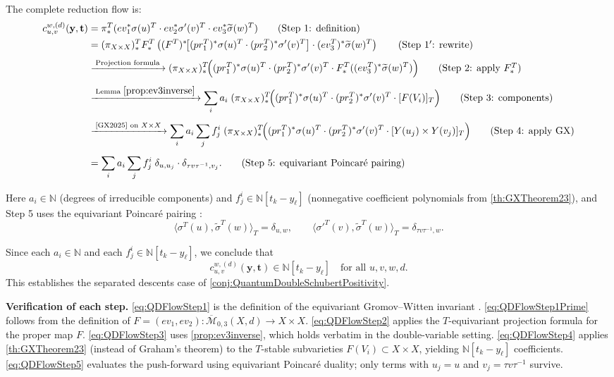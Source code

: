 The complete reduction flow is:
{\allowdisplaybreaks
\begin{align}
c_{u,v}^{w,(d)}(\mathbf{y},\mathbf{t})
&= \pi_*^T(ev_1^*\sigma(u)^T \cdot ev_2^*\sigma'(v)^T \cdot ev_3^*\widetilde{\sigma}(w)^T) \tag{Step 1: definition} \label{eq:QDFlowStep1}\\
&= (\pi_{X \times X})_*^T F_*^T\left((F^T)^*\!\big[(pr_1^T)^*\sigma(u)^T \cdot (pr_2^T)^*\sigma'(v)^T\big] \cdot (ev_3^T)^*\widetilde{\sigma}(w)^T\right) \tag{Step $1'$: rewrite} \label{eq:QDFlowStep1Prime}\\[4pt]
&\xrightarrow{\;\text{Projection formula}\;} (\pi_{X \times X})_*^T\!\Big((pr_1^T)^*\sigma(u)^T \cdot (pr_2^T)^*\sigma'(v)^T \cdot F_*^T((ev_3^T)^*\widetilde{\sigma}(w)^T)\Big) \tag{Step 2: apply $F_*^T$} \label{eq:QDFlowStep2}\\[4pt]
&\xrightarrow{\;\text{Lemma }\cref{prop:ev3inverse}\;} \sum_i a_i \; (\pi_{X \times X})_*^T\!\Big((pr_1^T)^*\sigma(u)^T \cdot (pr_2^T)^*\sigma'(v)^T \cdot [F(V_i)]_T\Big) \tag{Step 3: components} \label{eq:QDFlowStep3}\\[4pt]
&\xrightarrow{\;\text{\cite[Thm 2.3]{GX2025} on }X\times X\;} \sum_i a_i \sum_j f_j^i \; (\pi_{X \times X})_*^T\!\Big((pr_1^T)^*\sigma(u)^T \cdot (pr_2^T)^*\sigma'(v)^T \cdot [Y(u_j)\times Y(v_j)]_T\Big) \tag{Step 4: apply GX} \label{eq:QDFlowStep4}\\[4pt]
&= \sum_i a_i \sum_j f_j^i \; \delta_{u,u_j} \cdot \delta_{\tau v \tau^{-1}, v_j}. \tag{Step 5: equivariant Poincar\'e pairing} \label{eq:QDFlowStep5}
\end{align}
}

Here $a_i \in \mathbb{N}$ (degrees of irreducible components) and $f_j^i \in \mathbb{N}[t_k - y_\ell]$ (nonnegative coefficient polynomials from \cref{th:GXTheorem23}), and Step 5 uses the equivariant Poincar\'e pairing \cite[Proposition 3.1]{Mihalcea}:
$$\langle \sigma^T(u), \widetilde{\sigma}^T(w)\rangle_T = \delta_{u,w},\qquad \langle \sigma'^T(v), \widetilde{\sigma}^T(w)\rangle_T = \delta_{\tau v \tau^{-1}, w}.$$

Since each $a_i \in \mathbb{N}$ and each $f_j^i \in \mathbb{N}[t_k - y_\ell]$, we conclude that
$$c_{u,v}^{w,(d)}(\mathbf{y},\mathbf{t}) \in \mathbb{N}[t_k - y_\ell]\quad\text{for all }u,v,w,d.$$
This establishes the separated descents case of \cref{conj:QuantumDoubleSchubertPositivity}.

\medskip
\noindent\textbf{Verification of each step.} \cref{eq:QDFlowStep1} is the definition of the equivariant Gromov--Witten invariant \cite[Equation (6.3)]{Mihalcea}. \cref{eq:QDFlowStep1Prime} follows from the definition of $F = (ev_1, ev_2): \overline{\mathcal{M}}_{0,3}(X,d) \to X \times X$. \cref{eq:QDFlowStep2} applies the $T$-equivariant projection formula for the proper map $F$. \cref{eq:QDFlowStep3} uses \cref{prop:ev3inverse}, which holds verbatim in the double-variable setting. \cref{eq:QDFlowStep4} applies \cref{th:GXTheorem23} (instead of Graham's theorem) to the $T$-stable subvarieties $F(V_i) \subset X \times X$, yielding $\mathbb{N}[t_k - y_\ell]$ coefficients. \cref{eq:QDFlowStep5} evaluates the push-forward using equivariant Poincar\'e duality; only terms with $u_j = u$ and $v_j = \tau v \tau^{-1}$ survive.

